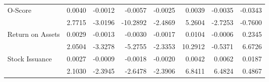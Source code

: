 \begin{sidewaystable}[htbp]
{\begin{tabular}{@{}lrrrrrrr@{}}
\multirow{2}{*}{O-Score} & 0.0040 & -0.0012 & -0.0057 & -0.0025 & 0.0039 & -0.0035 & -0.0343 \\
& 2.7715 & -3.0196 & -10.2892 & -2.4869 & 5.2604 & -2.7253 & -0.7600 \\
\multirow{2}{*}{Return on Assets} & 0.0029 & -0.0013 & -0.0030 & -0.0017 & 0.0104 & -0.0006 & 0.2345 \\
& 2.0504 & -3.3278 & -5.2755 & -2.3353 & 10.2912 & -0.5371 & 6.6726 \\
\multirow{2}{*}{Stock Issuance} & 0.0027 & -0.0009 & -0.0018 & -0.0020 & 0.0042 & 0.0062 & 0.0187 \\
& 2.1030 & -2.3945 & -2.6478 & -2.3906 & 6.8411 & 6.4824 & 0.4867 \\ \bottomrule
\end{tabular}%
}
\end{sidewaystable}

